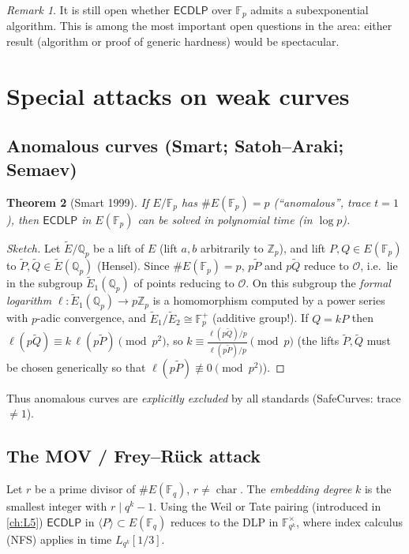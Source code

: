 \documentclass[11pt,a4paper,oneside]{book}
\theoremstyle{plain}
\newtheorem{theorem}{Theorem}[chapter]
\theoremstyle{definition}
\theoremstyle{remark}
\newtheorem{remark}[theorem]{Remark}
\newcommand{\Z}{\mathbb{Z}}
\newcommand{\Q}{\mathbb{Q}}
\newcommand{\F}{\mathbb{F}}
\newcommand{\Fp}{\mathbb{F}_p}
\newcommand{\Fq}{\mathbb{F}_q}
\newcommand{\Oinf}{\mathcal{O}}
\newcommand{\ECDLP}{\mathsf{ECDLP}}
\begin{document}
\begin{remark}
It is still open whether $\ECDLP$ over $\Fp$ admits a subexponential algorithm. This is among the most important open questions in the area: either result (algorithm or proof of generic hardness) would be spectacular.
\end{remark}

\section{Special attacks on weak curves}

\subsection{Anomalous curves (Smart; Satoh--Araki; Semaev)}

\begin{theorem}[Smart 1999]\label{thm:smart}
If $E/\Fp$ has $\#E(\Fp)=p$ (``anomalous'', trace $t=1$), then $\ECDLP$ in $E(\Fp)$ can be solved in polynomial time (in $\log p$).
\end{theorem}
\begin{proof}[Sketch]
Let $\tilde E/\Q_p$ be a lift of $E$ (lift $a,b$ arbitrarily to $\Z_p$), and lift $P,Q\in E(\Fp)$ to $\tilde P,\tilde Q\in\tilde E(\Q_p)$ (Hensel). Since $\#E(\Fp)=p$, $p\tilde P$ and $p\tilde Q$ reduce to $\Oinf$, i.e.\ lie in the subgroup $\tilde E_1(\Q_p)$ of points reducing to $\Oinf$. On this subgroup the \emph{formal logarithm} $\ell:\tilde E_1(\Q_p)\to p\Z_p$ is a homomorphism computed by a power series with $p$-adic convergence, and $\tilde E_1/\tilde E_2\cong\Fp^+$ (additive group!). If $Q=kP$ then $\ell(p\tilde Q)\equiv k\,\ell(p\tilde P)\pmod{p^2}$, so $k\equiv\frac{\ell(p\tilde Q)/p}{\ell(p\tilde P)/p}\pmod p$ (the lifts $\tilde P,\tilde Q$ must be chosen generically so that $\ell(p\tilde P)\not\equiv 0\pmod {p^2}$).
\end{proof}

Thus anomalous curves are \emph{explicitly excluded} by all standards (SafeCurves: trace $\ne1$).

\subsection{The MOV / Frey--R\"uck attack}\label{sec:MOV-short}

Let $r$ be a prime divisor of $\#E(\Fq)$, $r\ne\operatorname{char}$. The \emph{embedding degree} $k$ is the smallest integer with $r\mid q^k-1$. Using the Weil or Tate pairing (introduced in \cref{ch:L5}) $\ECDLP$ in $\langle P\rangle\subset E(\Fq)$ reduces to the DLP in $\F_{q^k}^\times$, where index calculus (NFS) applies in time $L_{q^k}[1/3]$.
\end{document}
